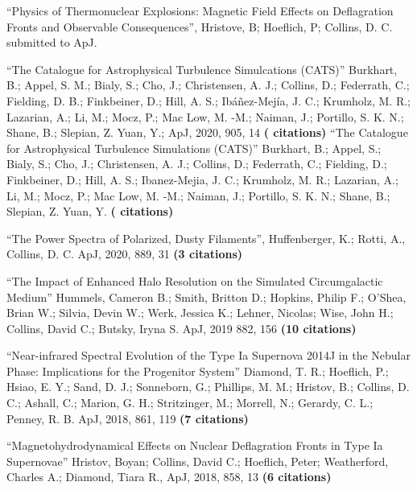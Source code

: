 \newcommand{\citeform}[1]{{\bf (#1 citations)}}

\medskip
\noindent

``Physics of Thermonuclear Explosions: Magnetic Field Effects on Deflagration Fronts and Observable Consequences'', Hristove, B; Hoeflich, P; Collins, D. C. submitted to ApJ.

\medskip
\noindent
``The Catalogue for Astrophysical Turbulence Simulcations (CATS)'' Burkhart, B.; Appel, S. M.; Bialy, S.; Cho, J.; Christensen, A. J.; Collins, D.; Federrath, C.; Fielding, D. B.; Finkbeiner, D.; Hill, A. S.; Ibáñez-Mejía, J. C.; Krumholz, M. R.; Lazarian, A.; Li, M.; Mocz, P.; Mac Low, M. -M.; Naiman, J.; Portillo, S. K. N.; Shane, B.; Slepian, Z. Yuan, Y.;  ApJ, 2020, 905, 14
\citeform{}%
``The Catalogue for Astrophysical Turbulence Simulations (CATS)'' Burkhart, B.;
Appel, S.; Bialy, S.; Cho, J.; Christensen, A. J.; Collins, D.; Federrath, C.;
Fielding, D.; Finkbeiner, D.; Hill, A. S.; Ibanez-Mejia, J. C.; Krumholz, M. R.;
Lazarian, A.; Li, M.; Mocz, P.; Mac Low, M. -M.; Naiman, J.; Portillo, S. K. N.;
Shane, B.; Slepian, Z. Yuan, Y.
\citeform{}



\medskip
\noindent
``The Power Spectra of Polarized, Dusty Filaments'', Huffenberger, K.; Rotti,
A., Collins, D. C. ApJ, 2020, 889, 31
\citeform{3}%

\medskip
\noindent
``The Impact of Enhanced Halo Resolution on the Simulated Circumgalactic Medium''
Hummels, Cameron B.; Smith, Britton D.; Hopkins, Philip F.; O'Shea, Brian W.; Silvia, Devin W.; 
Werk, Jessica K.; Lehner, Nicolas; Wise, John H.; Collins, David C.; Butsky, Iryna S.   
ApJ, 2019 882, 156
\citeform{10}%

\medskip
\noindent
``Near-infrared Spectral Evolution of the Type Ia Supernova 2014J in the Nebular
Phase: Implications for the Progenitor System''
Diamond, T. R.; Hoeflich, P.; Hsiao, E. Y.; Sand, D. J.; Sonneborn, G.;
Phillips, M. M.; Hristov, B.; Collins, D. C.; Ashall, C.; Marion, G. H.;
Stritzinger, M.; Morrell, N.; Gerardy, C. L.; Penney, R. B.
ApJ, 2018, 861, 119
\citeform{7}%

\medskip
\noindent
``Magnetohydrodynamical Effects on Nuclear Deflagration Fronts in Type Ia Supernovae''
Hristov, Boyan; Collins, David C.; Hoeflich, Peter; Weatherford, Charles A.; Diamond, Tiara R., 
ApJ, 2018, 858, 13
\citeform{6}%


